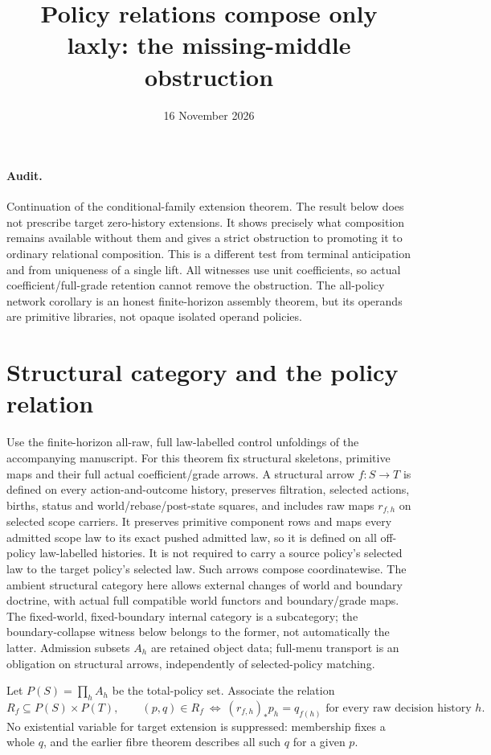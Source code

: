 \documentclass[11pt]{article}
\title{Policy relations compose only laxly: the missing-middle obstruction}
\date{16 November 2026}
\begin{document}
\maketitle
\paragraph{Audit.} Continuation of the conditional-family extension theorem. The result below does not prescribe target zero-history extensions. It shows precisely what composition remains available without them and gives a strict obstruction to promoting it to ordinary relational composition. This is a different test from terminal anticipation and from uniqueness of a single lift. All witnesses use unit coefficients, so actual coefficient/full-grade retention cannot remove the obstruction. The all-policy network corollary is an honest finite-horizon assembly theorem, but its operands are primitive libraries, not opaque isolated operand policies.

\section{Structural category and the policy relation}
Use the finite-horizon all-raw, full law-labelled control unfoldings of the accompanying manuscript. For this theorem fix structural skeletons, primitive maps and their full actual coefficient/grade arrows. A structural arrow $f:S\to T$ is defined on every action-and-outcome history, preserves filtration, selected actions, births, status and world/rebase/post-state squares, and includes raw maps $r_{f,h}$ on selected scope carriers. It preserves primitive component rows and maps every admitted scope law to its exact pushed admitted law, so it is defined on all off-policy law-labelled histories. It is not required to carry a source policy's selected law to the target policy's selected law. Such arrows compose coordinatewise. The ambient structural category here allows external changes of world and boundary doctrine, with actual full compatible world functors and boundary/grade maps. The fixed-world, fixed-boundary internal category is a subcategory; the boundary-collapse witness below belongs to the former, not automatically the latter. Admission subsets $A_h$ are retained object data; full-menu transport is an obligation on structural arrows, independently of selected-policy matching.

Let $P(S)=\prod_h A_h$ be the total-policy set. Associate the relation
\[
 R_f\subseteq P(S)\times P(T),\qquad
 (p,q)\in R_f\ \Longleftrightarrow\ (r_{f,h})_*p_h=q_{f(h)}
 \text{ for every raw decision history }h.             \tag{1}
\]
No existential variable for target extension is suppressed: membership fixes a whole $q$, and the earlier fibre theorem describes all such $q$ for a given $p$.
\end{document}

